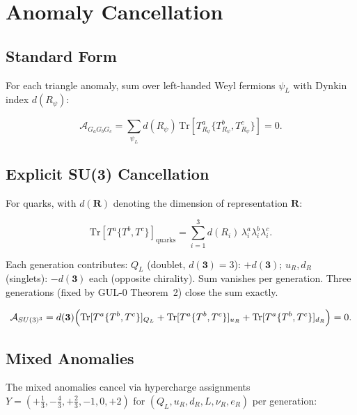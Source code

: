 \documentclass[11pt]{article}
\begin{document}
\section{Anomaly Cancellation}
\label{sec:anomaly}

\subsection{Standard Form}

For each triangle anomaly, sum over left-handed Weyl fermions
$\psi_L$ with Dynkin index $d(R_\psi)$:

\begin{equation}
  \mathcal{A}_{G_a G_b G_c}
  = \sum_{\psi_L} d(R_\psi)\,
    \mathrm{Tr}\!\left[T^a_{R_\psi}
    \{T^b_{R_\psi},T^c_{R_\psi}\}\right] = 0.
\end{equation}

\subsection{Explicit SU(3) Cancellation}

For quarks, with $d(\mathbf{R})$ denoting the dimension of
representation $\mathbf{R}$:

\begin{equation}
  \mathrm{Tr}[T^a\{T^b,T^c\}]_\text{quarks}
  = \sum_{i=1}^{3} d(R_i)\,\lambda_i^a\lambda_i^b\lambda_i^c.
\end{equation}

Each generation contributes:
$Q_L$ (doublet, $d(\mathbf{3})=3$): $+d(\mathbf{3})$;
$u_R,d_R$ (singlets): $-d(\mathbf{3})$ each (opposite chirality).
Sum vanishes per generation. Three generations (fixed by GUL-0
Theorem~2) close the sum exactly.

\begin{equation}
  \mathcal{A}_{SU(3)^3}
  = d(\mathbf{3})\Bigl(
      \mathrm{Tr}[T^a\{T^b,T^c\}]_{Q_L}
    + \mathrm{Tr}[T^a\{T^b,T^c\}]_{u_R}
    + \mathrm{Tr}[T^a\{T^b,T^c\}]_{d_R}
    \Bigr) = 0.
\end{equation}

\subsection{Mixed Anomalies}

The mixed anomalies cancel via hypercharge assignments
$Y=(+\tfrac{1}{3},-\tfrac{4}{3},+\tfrac{2}{3},-1,0,+2)$
for $(Q_L,u_R,d_R,L,\nu_R,e_R)$ per generation:
\end{document}
